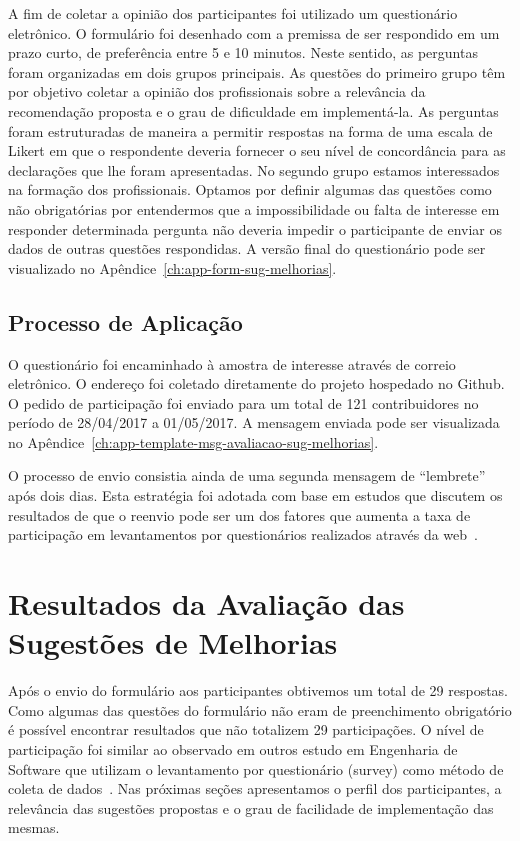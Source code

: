 A fim de coletar a opinião dos participantes foi utilizado um questionário
eletrônico. O formulário foi desenhado com a premissa de ser respondido em um
prazo curto, de preferência entre 5 e 10 minutos. Neste sentido, as perguntas
foram organizadas em dois grupos principais. As questões do primeiro grupo têm
por objetivo coletar a opinião dos profissionais sobre a relevância da
recomendação proposta e o grau de dificuldade em implementá-la. As perguntas
foram estruturadas de maneira a permitir respostas na forma de uma escala de
Likert em que o respondente deveria fornecer o seu nível de concordância para
as declarações que lhe foram apresentadas. No segundo grupo estamos
interessados na formação dos profissionais. Optamos por definir algumas das
questões como não obrigatórias por entendermos que a impossibilidade ou falta
de interesse em responder determinada pergunta não deveria impedir o
participante de enviar os dados de outras questões respondidas. A versão final
do questionário pode ser visualizado no
Apêndice~\ref{ch:app-form-sug-melhorias}.

\subsection{Processo de Aplicação}
\label{ssub:processo_de_aplicação}

O questionário foi encaminhado à amostra de interesse através de correio
eletrônico. O endereço foi coletado diretamente do projeto hospedado no Github.
O pedido de participação foi enviado para um total de 121 contribuidores no
período de 28/04/2017 a 01/05/2017. A mensagem enviada pode ser visualizada no
Apêndice~\ref{ch:app-template-msg-avaliacao-sug-melhorias}.

O processo de envio consistia ainda de uma segunda mensagem de ``lembrete''
após dois dias. Esta estratégia foi adotada com base em estudos que discutem os
resultados de que o reenvio pode ser um dos fatores que aumenta a taxa de
participação em levantamentos por questionários realizados através da
web~\cite{fan2010factors}.

\section{Resultados da Avaliação das Sugestões de Melhorias}
\label{sec:resultados_avaliacao_sug_de_melhorias}

Após o envio do formulário aos participantes obtivemos um total de 29
respostas.  Como algumas das questões do formulário não eram de preenchimento
obrigatório é possível encontrar resultados que não totalizem 29 participações.
O nível de participação foi similar ao observado em outros estudo em Engenharia
de Software que utilizam o levantamento por questionário (survey) como método
de coleta de dados~\cite{fan2010factors}. Nas próximas seções apresentamos o
perfil dos participantes, a relevância das sugestões propostas e o grau de
facilidade de implementação das mesmas.

